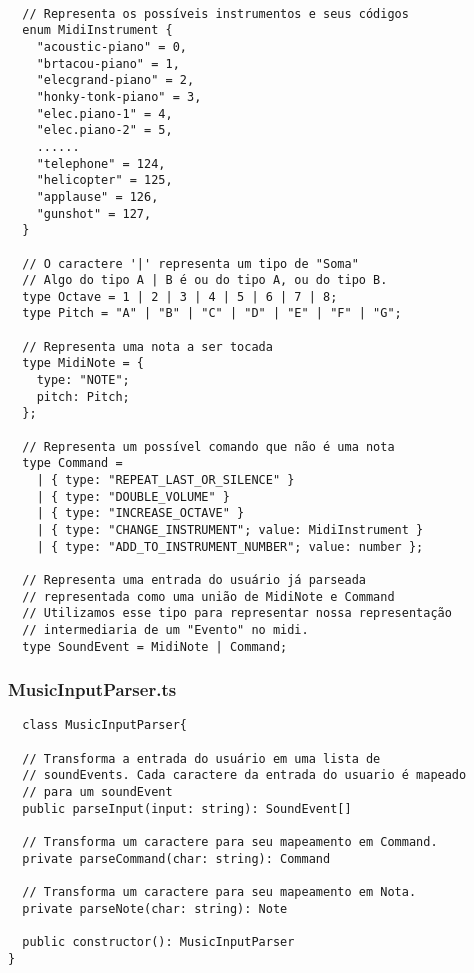 \documentclass[12pt]{article}
\begin{document}
\begin{verbatim}

  // Representa os possíveis instrumentos e seus códigos
  enum MidiInstrument {
    "acoustic-piano" = 0,
    "brtacou-piano" = 1,
    "elecgrand-piano" = 2,
    "honky-tonk-piano" = 3,
    "elec.piano-1" = 4,
    "elec.piano-2" = 5,
    ......
    "telephone" = 124,
    "helicopter" = 125,
    "applause" = 126,
    "gunshot" = 127,
  }

  // O caractere '|' representa um tipo de "Soma"
  // Algo do tipo A | B é ou do tipo A, ou do tipo B.
  type Octave = 1 | 2 | 3 | 4 | 5 | 6 | 7 | 8;
  type Pitch = "A" | "B" | "C" | "D" | "E" | "F" | "G";

  // Representa uma nota a ser tocada
  type MidiNote = {
    type: "NOTE";
    pitch: Pitch;
  };

  // Representa um possível comando que não é uma nota
  type Command =
    | { type: "REPEAT_LAST_OR_SILENCE" }
    | { type: "DOUBLE_VOLUME" }
    | { type: "INCREASE_OCTAVE" }
    | { type: "CHANGE_INSTRUMENT"; value: MidiInstrument }
    | { type: "ADD_TO_INSTRUMENT_NUMBER"; value: number };

  // Representa uma entrada do usuário já parseada
  // representada como uma união de MidiNote e Command
  // Utilizamos esse tipo para representar nossa representação
  // intermediaria de um "Evento" no midi.
  type SoundEvent = MidiNote | Command;

\end{verbatim}

\subsubsection{MusicInputParser.ts}

\begin{verbatim}
  class MusicInputParser{

  // Transforma a entrada do usuário em uma lista de 
  // soundEvents. Cada caractere da entrada do usuario é mapeado
  // para um soundEvent
  public parseInput(input: string): SoundEvent[]

  // Transforma um caractere para seu mapeamento em Command.
  private parseCommand(char: string): Command

  // Transforma um caractere para seu mapeamento em Nota.
  private parseNote(char: string): Note

  public constructor(): MusicInputParser
}
\end{verbatim}
\end{document}
